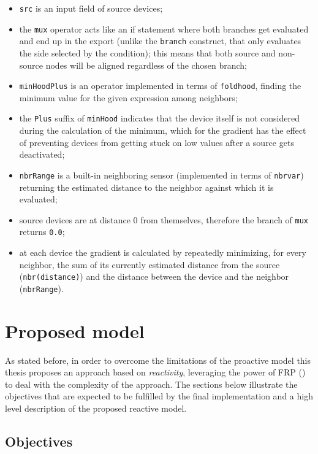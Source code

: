 \begin{itemize}
    \item \texttt{src} is an input field of source devices;
    \item the \texttt{mux} operator acts like an if statement where both branches get evaluated and end up in the export (unlike the \texttt{branch} construct, that only evaluates the side selected by the condition); this means that both source and non-source nodes will be aligned regardless of the chosen branch;
    \item \texttt{minHoodPlus} is an operator implemented in terms of \texttt{foldhood}, finding the minimum value for the given expression among neighbors;
    \item the \texttt{Plus} suffix of \texttt{minHood} indicates that the device itself is not considered during the calculation of the minimum, which for the gradient has the effect of preventing devices from getting stuck on low values after a source gets deactivated;
    \item \texttt{nbrRange} is a built-in neighboring sensor (implemented in terms of \texttt{nbrvar}) returning the estimated distance to the neighbor against which it is evaluated;
    \item source devices are at distance 0 from themselves, therefore the  branch of \texttt{mux} returns \texttt{0.0};
    \item at each device the gradient is calculated by repeatedly minimizing, for every neighbor, the sum of its currently estimated distance from the source (\texttt{nbr(distance)}) and the distance between the device and the neighbor (\texttt{nbrRange}).
\end{itemize}

\section{Proposed model}
\label{sec:proposed-model}

As stated before, in order to overcome the limitations of the proactive model this thesis proposes an approach based on \textit{reactivity}, leveraging the power of FRP () to deal with the complexity of the approach.
%
The sections below illustrate the objectives that are expected to be fulfilled by the final implementation and a high level description of the proposed reactive model.

\subsection{Objectives}

